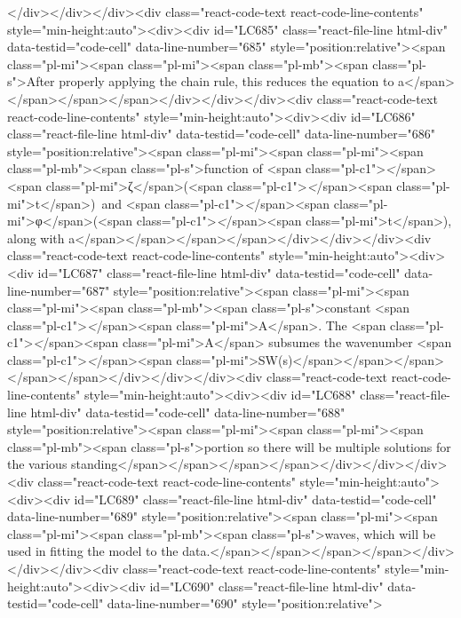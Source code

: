 {{{{{{{{</div></div></div><div class="react-code-text react-code-line-contents" style="min-height:auto"><div><div id="LC685" class="react-file-line html-div" data-testid="code-cell" data-line-number="685" style="position:relative"><span class="pl-mi"><span class="pl-mi"><span class="pl-mb"><span class="pl-s">After properly applying the chain rule, this reduces the equation to a</span></span></span></span></div></div></div><div class="react-code-text react-code-line-contents" style="min-height:auto"><div><div id="LC686" class="react-file-line html-div" data-testid="code-cell" data-line-number="686" style="position:relative"><span class="pl-mi"><span class="pl-mi"><span class="pl-mb"><span class="pl-s">function of <span class="pl-c1">\emph</span>{<span class="pl-mi">ζ</span>}(<span class="pl-c1">\emph</span>{<span class="pl-mi">t</span>})~and <span class="pl-c1">\emph</span>{<span class="pl-mi">φ</span>}(<span class="pl-c1">\emph</span>{<span class="pl-mi">t</span>}), along with a</span></span></span></span></div></div></div><div class="react-code-text react-code-line-contents" style="min-height:auto"><div><div id="LC687" class="react-file-line html-div" data-testid="code-cell" data-line-number="687" style="position:relative"><span class="pl-mi"><span class="pl-mi"><span class="pl-mb"><span class="pl-s">constant <span class="pl-c1">\emph</span>{<span class="pl-mi">A</span>}. The <span class="pl-c1">\emph</span>{<span class="pl-mi">A</span>} subsumes the wavenumber <span class="pl-c1">\emph</span>{<span class="pl-mi">SW(s)</span>}</span></span></span></span></div></div></div><div class="react-code-text react-code-line-contents" style="min-height:auto"><div><div id="LC688" class="react-file-line html-div" data-testid="code-cell" data-line-number="688" style="position:relative"><span class="pl-mi"><span class="pl-mi"><span class="pl-mb"><span class="pl-s">portion so there will be multiple solutions for the various standing</span></span></span></span></div></div></div><div class="react-code-text react-code-line-contents" style="min-height:auto"><div><div id="LC689" class="react-file-line html-div" data-testid="code-cell" data-line-number="689" style="position:relative"><span class="pl-mi"><span class="pl-mi"><span class="pl-mb"><span class="pl-s">waves, which will be used in fitting the model to the data.</span></span></span></span></div></div></div><div class="react-code-text react-code-line-contents" style="min-height:auto"><div><div id="LC690" class="react-file-line html-div" data-testid="code-cell" data-line-number="690" style="position:relative">
}}}}}}}}

